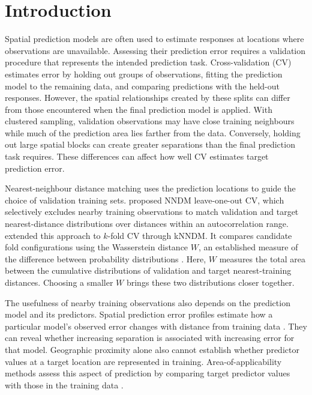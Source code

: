 \section{Introduction}
Spatial prediction models are often used to estimate responses at locations where observations are unavailable. Assessing their prediction error requires a validation procedure that represents the intended prediction task. Cross-validation (CV) estimates error by holding out groups of observations, fitting the prediction model to the remaining data, and comparing predictions with the held-out responses. However, the spatial relationships created by these splits can differ from those encountered when the final prediction model is applied. With clustered sampling, validation observations may have close training neighbours while much of the prediction area lies farther from the data. Conversely, holding out large spatial blocks can create greater separations than the final prediction task requires. These differences can affect how well CV estimates target prediction error.

Nearest-neighbour distance matching uses the prediction locations to guide the choice of validation training sets. \citet{mila2022nndm} proposed NNDM leave-one-out CV, which selectively excludes nearby training observations to match validation and target nearest-distance distributions over distances within an autocorrelation range. \citet{linnenbrink2024knndm} extended this approach to $k$-fold CV through kNNDM. It compares candidate fold configurations using the Wasserstein distance $W$, an established measure of the difference between probability distributions \citep{panaretos2019wasserstein}. Here, $W$ measures the total area between the cumulative distributions of validation and target nearest-training distances. Choosing a smaller $W$ brings these two distributions closer together.

The usefulness of nearby training observations also depends on the prediction model and its predictors. Spatial prediction error profiles estimate how a particular model's observed error changes with distance from training data \citep{brenning2023profiles}. They can reveal whether increasing separation is associated with increasing error for that model. Geographic proximity alone also cannot establish whether predictor values at a target location are represented in training. Area-of-applicability methods assess this aspect of prediction by comparing target predictor values with those in the training data \citep{meyer2021aoa}.

